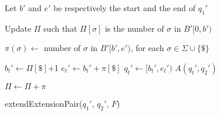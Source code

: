 \documentclass[runningheads,envcountsame,a4paper]{llncs}
\begin{document}
\begin{algorithm}
Let $b'$ and $e'$ be respectively the start and the end of $q_{1}'$\;

\tcp{$\Pi[\sigma]$ must be number of $\sigma$ in $B'[0,b')$, for each $\sigma \in \Sigma \cup \{\$\}$}
Update $\Pi$ such that $\Pi[\sigma]$ is the number of $\sigma$ in $B'[0, b')$\;

$\pi(\sigma) \gets$ number of $\sigma$ in $B'[b',e')$, for each $\sigma \in \Sigma \cup \{\$\}$\;

 {
      $b_{t}' \gets \Pi[ \$ ]$+1\;
      $e_{t}' \gets b_{t}' + \pi[ \$ ]$\;
      $q_{t}' \gets [b_{t}',e_{t}')$\;
      \Return $A(q_{t}', q_{2}')$\;
  }
\Else {
 \ForEach{$\sigma \in \Sigma$}{
    $b'_e \gets C[ \sigma ] + \Pi[ \sigma ]+1$\;
    $e'_e \gets b'_e + \pi[ \sigma ]$\;
      $q_{e}' \gets [b_{e}',e_{e}')$\;
    Append $(q_{t}', q_{2}')$ to $F(\sigma)$\;
      \Return an empty arc set\;

  }
}

$\Pi \gets \Pi + \pi$

\caption{extendExtensionPair($q_{1}'$, $q_{2}'$, $F$)}
\label{alg:processExtPair}
\end{algorithm}
\end{document}
